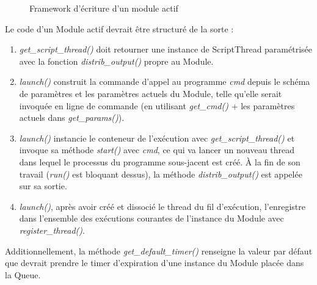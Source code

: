 \documentclass[]{article}
\begin{document}
    \begin{figure}[!h]
       \noindent{}
       \caption{Framework d'écriture d'un module actif}
       \label{abstractif}
    \end{figure}

\vspace{0.3cm}

\par Le code d'un Module actif devrait être structuré de la sorte :

\begin{enumerate}
\item \textit{get\_script\_thread()} doit retourner une instance de ScriptThread paramétrisée avec la fonction \textit{distrib\_output()} propre au Module.
\vspace{0.1cm}
\item \textit{launch()} construit la commande d'appel au programme \textit{cmd} depuis le schéma de paramètres et les paramètres actuels du Module, telle qu'elle serait invoquée en ligne de commande (en utilisant \textit{get\_cmd()} + les paramètres actuels dans \textit{get\_params()}).
\vspace{0.01cm}
\item \textit{launch()} instancie le conteneur de l'exécution avec \textit{get\_script\_thread()} et invoque sa méthode \textit{start()} avec \textit{cmd}, ce qui va lancer un nouveau thread dans lequel le processus du programme sous-jacent est créé. À la fin de son travail (\textit{run()} est bloquant dessus), la méthode \textit{distrib\_output()} est appelée sur sa sortie.
\vspace{0.1cm}
\item \textit{launch()}, après avoir créé et dissocié le thread du fil d'exécution, l'enregistre dans l'ensemble des exécutions courantes de l'instance du Module avec \textit{register\_thread()}.

\end{enumerate}
\vspace{0.2cm}
Additionnellement, la méthode \textit{get\_default\_timer()} renseigne la valeur par défaut que devrait prendre le timer d'expiration d'une instance du Module placée dans la Queue.
\end{document}
